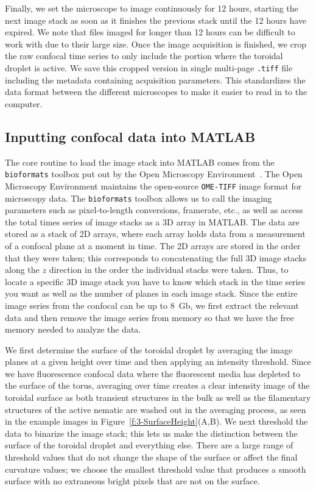 Finally, we set the microscope to image continuously for 12 hours, starting the next image stack as soon as it finishes the previous stack until the 12 hours have expired.
We note that files imaged for longer than 12 hours can be difficult to work with due to their large size.
Once the image acquisition is finished, we crop the raw confocal time series to only include the portion where the toroidal droplet is active.
We save this cropped version in single multi-page \texttt{.tiff} file including the metadata containing acquisition parameters.
This standardizes the data format between the different microscopes to make it easier to read in to the computer.


\subsection{Inputting confocal data into MATLAB}
The core routine to load the image stack into MATLAB comes from the \texttt{bioformats} toolbox put out by the Open Microscopy Environment~\cite{RN265}.
The Open Microscopy Environment maintains the open-source \texttt{OME-TIFF} image format for microscopy data.
The \texttt{bioformats} toolbox allows us to call the imaging parameters such as pixel-to-length conversions, framerate, etc., as well as access the total times series of image stacks as a 3D array in MATLAB.
The data are stored as a stack of 2D arrays, where each array holds data from a measurement of a confocal plane at a moment in time.
The 2D arrays are stored in the order that they were taken; this corresponds to concatenating the full 3D image stacks along the $z$ direction in the order the individual stacks were taken.
Thus, to locate a specific 3D image stack you have to know which stack in the time series you want as well as the number of planes in each image stack.
Since the entire image series from the confocal can be up to 8~Gb, we first extract the relevant data and then remove the image series from memory so that we have the free memory needed to analyze the data.

We first determine the surface of the toroidal droplet by averaging the image planes at a given height over time and then applying an intensity threshold.
Since we have fluorescence confocal data where the fluorescent media has depleted to the surface of the torus, averaging over time creates a clear intensity image of the toroidal surface as both transient structures in the bulk as well as the filamentary structures of the active nematic are washed out in the averaging process, as seen in the example images in Figure~\ref{f:3-SurfaceHeight}(A,B).
We next threshold the data to binarize the image stack; this lets us make the distinction between the surface of the toroidal droplet and everything else.
There are a large range of threshold values that do not change the shape of the surface or affect the final curvature values; we choose the smallest threshold value that produces a smooth surface with no extraneous bright pixels that are not on the surface.


